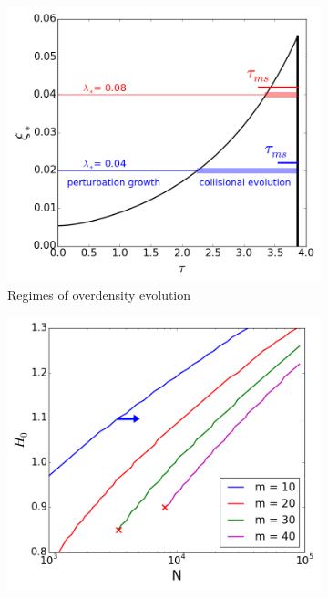  \begin{figure}
\center
    \centering
    \begin{subfigure}[b]{0.49\textwidth}
    	\centering
    	\includegraphics[width=\textwidth]{Figures/1_tau_ms.png}
        \caption{Regimes of overdensity evolution}
        \label{Fig:1_tau_ms}
    \end{subfigure}
    \begin{subfigure}[b]{0.49\textwidth}
    	\centering
    	\includegraphics[width=\textwidth]{Figures/1_segregation_zone.png}

\end{subfigure}
\end{figure}
